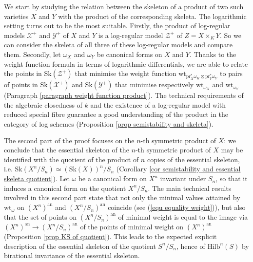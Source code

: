 \documentclass{amsart}%
\numberwithin{equation}{subsection}
\theoremstyle{plain2}
\theoremstyle{definition2}
\theoremstyle{stepstyle}
\theoremstyle{point}
\theoremstyle{subpoint}
\newcommand{\cX}{\ensuremath{\mathscr{X}}}
\newcommand{\cY}{\ensuremath{\mathscr{Y}}}
\newcommand{\cZ}{\ensuremath{\mathscr{Z}}}
\renewcommand{\cZ}{\ensuremath{\mathscr{Z}}}
\renewcommand{\cY}{\ensuremath{\mathscr{Y}}}
\newcommand{\Hilb}{\ensuremath{\mathrm{Hilb}}}
\newcommand{\pr}{\mathrm{pr}}
\newcommand{\an}{\mathrm{an}}
\newcommand{\weight}{\mathrm{wt}}
\newcommand{\Sk}{\mathrm{Sk}}
\begin{document}
We start by studying the relation between the skeleton of a product of two such varieties $X$ and $Y$ with the product of the corresponding skeleta. The logarithmic setting turns out to be the most suitable. Firstly, the product of log-regular models $\cX^+$ and $\cY^+$ of $X$ and $Y$ is a log-regular model $\cZ^+$ of $Z=X\times_K Y$. So we can consider the skeleta of all three of these log-regular models and compare them. Secondly, let $\omega_{X}$ and $\omega_Y$ be canonical forms on $X$ and $Y$. Thanks to the weight function formula in terms of logarithmic differentials, we are able to relate the points in $\Sk(\cZ^+)$ that minimise the weight function $\weight_{\pr_X^*\omega_K \otimes \pr_Y^*\omega_Y}$ to pairs of points in $\Sk(\cX^+)$ and $\Sk(\cY^+)$ that minimise respectively $\weight_{\omega_X}$ and $\weight_{\omega_Y}$ (Paragraph \ref{paragraph weight function product}). The technical requirements of the algebraic closedness of $k$ and the existence of a log-regular model with reduced special fibre guarantee a good understanding of the product in the category of log schemes (Proposition \ref{prop semistability and skeleta}).

The second part of the proof focuses on the $n$-th symmetric product of $X$: we conclude that the essential skeleton of the $n$-th symmetric product of $X$ may be identified with the quotient of the product of $n$ copies of the essential skeleton, i.e. $\Sk(X^n/S_n) \simeq (\Sk(X))^n / S_n$ (Corollary \ref{cor semistability and essential skeleta quotient}). Let $\omega$ be a canonical form on $X^n$ invariant under $S_n$, so that it induces a canonical form on the quotient $X^n/S_n$. The main technical results involved in this second part state that not only the minimal values attained by $\weight_{\omega}$ on $(X^n)^\an$ and $(X^n/S_n)^\an$ coincide (see (\ref{equ equality weight})), but also that the set of points on $(X^n/S_n)^\an$ of minimal weight is equal to the image via $(X^n)^\an \rightarrow (X^n/S_n)^\an$ of the points of minimal weight on $(X^n)^\an$ (Proposition \ref{prop KS of quotient}). This leads to the expected explicit description of the essential skeleton of the quotient $S^n/S_n$, hence of $\Hilb^n(S)$ by birational invariance of the essential skeleton.
\end{document}
